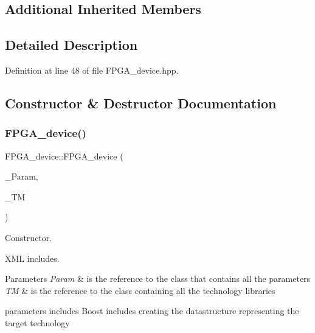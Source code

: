 \subsection*{Additional Inherited Members}


\subsection{Detailed Description}


Definition at line 48 of file F\+P\+G\+A\+\_\+device.\+hpp.



\subsection{Constructor \& Destructor Documentation}
\mbox{\label{classFPGA__device_a7c2ceb21b31c8936187ba4d44cebd653}} 
\subsubsection{\texorpdfstring{F\+P\+G\+A\+\_\+device()}{FPGA\_device()}}
{\footnotesize\ttfamily F\+P\+G\+A\+\_\+device\+::\+F\+P\+G\+A\+\_\+device (\begin{DoxyParamCaption}\item[{const \hyperlink{Parameter_8hpp_a37841774a6fcb479b597fdf8955eb4ea}{Parameter\+Const\+Ref} \&}]{\+\_\+\+Param,  }\item[{const \hyperlink{technology__manager_8hpp_a4b9ecd440c804109c962654f9227244e}{technology\+\_\+manager\+Ref} \&}]{\+\_\+\+TM }\end{DoxyParamCaption})}



Constructor. 

X\+ML includes.


\begin{DoxyParams}{Parameters}
{\em Param} & is the reference to the class that contains all the parameters \\
\hline
{\em TM} & is the reference to the class containing all the technology libraries\\
\hline
\end{DoxyParams}
parameters\textquotesingle{} includes Boost includes creating the datastructure representing the target technology 

